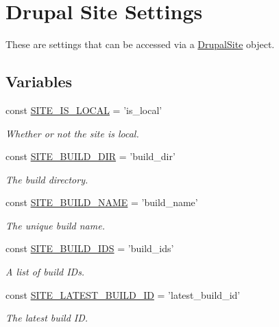 \hypertarget{group__site__settings}{\section{Drupal Site Settings}
\label{group__site__settings}
}


These are settings that can be accessed via a \hyperlink{classDrupalSite}{Drupal\-Site} object.  


\subsection*{Variables}
\begin{DoxyCompactItemize}
\item 
const \hyperlink{group__site__settings_ga5745a54a3d42630202e68e5b7a423e12}{S\-I\-T\-E\-\_\-\-I\-S\-\_\-\-L\-O\-C\-A\-L} = 'is\-\_\-local'
\begin{DoxyCompactList}\small\item\em Whether or not the site is local. \end{DoxyCompactList}\item 
const \hyperlink{group__site__settings_ga5135162217fc7ae791c74a52ecb45860}{S\-I\-T\-E\-\_\-\-B\-U\-I\-L\-D\-\_\-\-D\-I\-R} = 'build\-\_\-dir'
\begin{DoxyCompactList}\small\item\em The build directory. \end{DoxyCompactList}\item 
const \hyperlink{group__site__settings_ga125a82157d28745627ec431365175489}{S\-I\-T\-E\-\_\-\-B\-U\-I\-L\-D\-\_\-\-N\-A\-M\-E} = 'build\-\_\-name'
\begin{DoxyCompactList}\small\item\em The unique build name. \end{DoxyCompactList}\item 
const \hyperlink{group__site__settings_ga51a786d38e1ede6f5b887797b6f3d20d}{S\-I\-T\-E\-\_\-\-B\-U\-I\-L\-D\-\_\-\-I\-D\-S} = 'build\-\_\-ids'
\begin{DoxyCompactList}\small\item\em A list of build I\-Ds. \end{DoxyCompactList}\item 
const \hyperlink{group__site__settings_gafaa055bd264d0d16e8b6059cee84bfa4}{S\-I\-T\-E\-\_\-\-L\-A\-T\-E\-S\-T\-\_\-\-B\-U\-I\-L\-D\-\_\-\-I\-D} = 'latest\-\_\-build\-\_\-id'
\begin{DoxyCompactList}\small\item\em The latest build I\-D. \end{DoxyCompactList}\item 

\end{DoxyCompactItemize}
